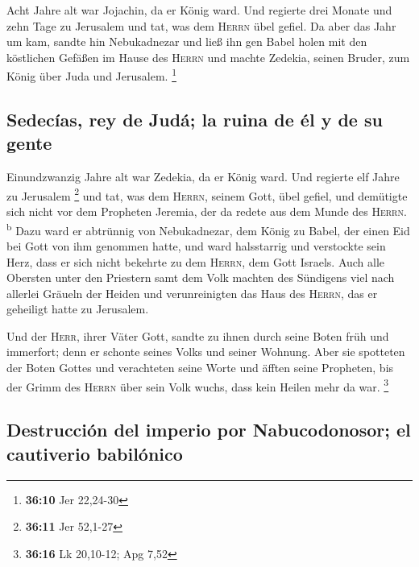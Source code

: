  Acht Jahre alt war Jojachin, da er König ward. Und
regierte drei Monate und zehn Tage zu Jerusalem und tat, was dem
\textsc{Herrn} übel gefiel.  Da aber das Jahr um kam,
sandte hin Nebukadnezar und ließ ihn gen Babel holen mit den köstlichen
Gefäßen im Hause des \textsc{Herrn} und machte Zedekia, seinen Bruder,
zum König über Juda und Jerusalem. \footnote{\textbf{36:10} Jer 22,24-30}

\hypertarget{sedecuxedas-rey-de-juduxe1-la-ruina-de-uxe9l-y-de-su-gente}{%
\subsection{Sedecías, rey de Judá; la ruina de él y de su
gente}\label{sedecuxedas-rey-de-juduxe1-la-ruina-de-uxe9l-y-de-su-gente}}

 Einundzwanzig Jahre alt war Zedekia, da er König ward.
Und regierte elf Jahre zu Jerusalem \footnote{\textbf{36:11} Jer 52,1-27}
 und tat, was dem \textsc{Herrn}, seinem Gott, übel
gefiel, und demütigte sich nicht vor dem Propheten Jeremia, der da
redete aus dem Munde des \textsc{Herrn}. \textsuperscript{b}
 Dazu ward er abtrünnig von Nebukadnezar, dem König zu
Babel, der einen Eid bei Gott von ihm genommen hatte, und ward
halsstarrig und verstockte sein Herz, dass er sich nicht bekehrte zu dem
\textsc{Herrn}, dem Gott Israels.  Auch alle Obersten
unter den Priestern samt dem Volk machten des Sündigens viel nach
allerlei Gräueln der Heiden und verunreinigten das Haus des
\textsc{Herrn}, das er geheiligt hatte zu Jerusalem.

 Und der \textsc{Herr}, ihrer Väter Gott, sandte zu ihnen
durch seine Boten früh und immerfort; denn er schonte seines Volks und
seiner Wohnung.  Aber sie spotteten der Boten Gottes und
verachteten seine Worte und äfften seine Propheten, bis der Grimm des
\textsc{Herrn} über sein Volk wuchs, dass kein Heilen mehr da war.
\footnote{\textbf{36:16} Lk 20,10-12; Apg 7,52}

\hypertarget{destrucciuxf3n-del-imperio-por-nabucodonosor-el-cautiverio-babiluxf3nico}{%
\subsection{Destrucción del imperio por Nabucodonosor; el cautiverio
babilónico}\label{destrucciuxf3n-del-imperio-por-nabucodonosor-el-cautiverio-babiluxf3nico}}

